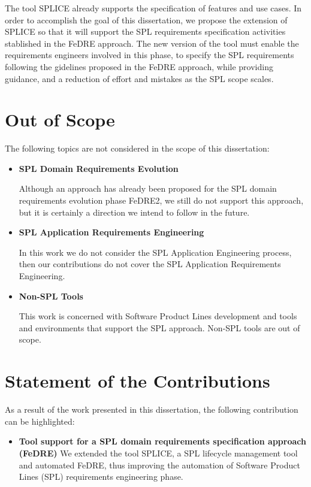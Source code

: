 The tool \ac{SPLICE} already supports the specification of features and use cases. In order to accomplish 
the goal of this dissertation, we propose the extension of \ac{SPLICE} so that it will support the \ac{SPL} 
requirements specification activities stablished in the \ac{FeDRE} approach. The new version of the tool 
must enable the requirements engineers involved in this phase, to specify the \ac{SPL} requirements following 
the gidelines proposed in the \ac{FeDRE} approach, while providing guidance, and a reduction of effort and 
mistakes as the \ac{SPL} scope scales.
 
\section{Out of Scope}
\label{sc:outofscope}
The following topics are not considered in the scope of this dissertation: 
\begin{itemize}
\item \textbf{SPL Domain Requirements Evolution}

Although an approach has already been proposed for the \ac{SPL} domain requirements
evolution phase \ac{FeDRE2}, we still do not support this approach, but it is certainly a 
direction we intend to follow in the future.
\item \textbf{SPL Application Requirements Engineering}

In this work we do not consider the \ac{SPL} Application Engineering process, then our contributions do 
not cover  the \ac{SPL} Application Requirements Engineering.
\item \textbf{Non-SPL Tools}

This work is concerned with Software Product Lines development and tools and
environments that support the \ac{SPL} approach. Non-SPL tools are out of scope.
\end{itemize}

\section{Statement of the Contributions}
\label{sc:contributions}
As a result of the work presented in this dissertation, the following contribution can be highlighted:
\begin{itemize}
\item \textbf{Tool support for a SPL domain requirements specification approach
(FeDRE)} 
We extended the tool \ac{SPLICE}, a \ac{SPL} lifecycle management tool
and automated \acf{FeDRE}, thus improving the automation of Software Product Lines (\ac{SPL}) requirements engineering phase.
\end{itemize}

